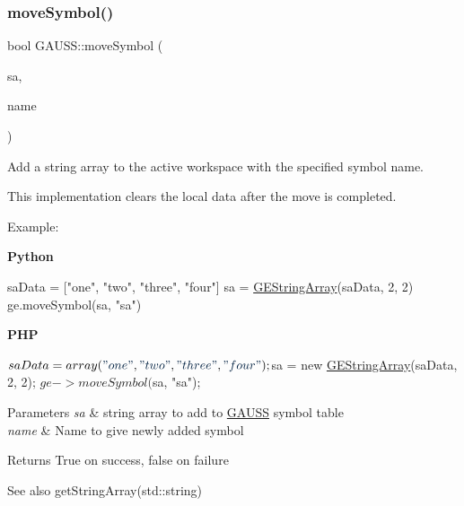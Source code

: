 \subsubsection{\texorpdfstring{move\+Symbol()}{moveSymbol()}\hspace{0.1cm}{\footnotesize\ttfamily [5/6]}}
{\footnotesize\ttfamily bool G\+A\+U\+S\+S\+::move\+Symbol (\begin{DoxyParamCaption}\item[{\hyperlink{class_g_e_string_array}{G\+E\+String\+Array} $\ast$}]{sa,  }\item[{std\+::string}]{name }\end{DoxyParamCaption})}



Add a string array to the active workspace with the specified symbol name. 

This implementation clears the local data after the move is completed.

Example\+:

{\bfseries Python} 
\begin{DoxyCode}
saData = [\textcolor{stringliteral}{"one"}, \textcolor{stringliteral}{"two"}, \textcolor{stringliteral}{"three"}, \textcolor{stringliteral}{"four"}]
sa = \hyperlink{class_g_e_string_array}{GEStringArray}(saData, 2, 2)
ge.moveSymbol(sa, \textcolor{stringliteral}{"sa"})
\end{DoxyCode}


{\bfseries P\+HP} 
\begin{DoxyCode}
$saData = array(\textcolor{stringliteral}{"one"}, \textcolor{stringliteral}{"two"}, \textcolor{stringliteral}{"three"}, \textcolor{stringliteral}{"four"});
$sa = \textcolor{keyword}{new} \hyperlink{class_g_e_string_array}{GEStringArray}(saData, 2, 2);
$ge->moveSymbol($sa, \textcolor{stringliteral}{"sa"});
\end{DoxyCode}



\begin{DoxyParams}{Parameters}
{\em sa} & string array to add to \hyperlink{class_g_a_u_s_s}{G\+A\+U\+SS} symbol table \\
\hline
{\em name} & Name to give newly added symbol \\
\hline
\end{DoxyParams}
\begin{DoxyReturn}{Returns}
True on success, false on failure
\end{DoxyReturn}
\begin{DoxySeeAlso}{See also}
get\+String\+Array(std\+::string) 
\end{DoxySeeAlso}
\mbox{\label{class_g_a_u_s_s_aaa4c58f16202914263f59de1dcaeeb7c}} 
